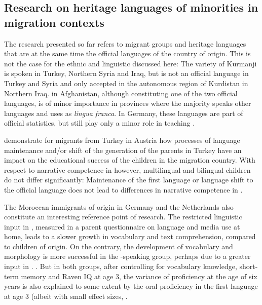 \documentclass[output=paper,colorlinks,citecolor=brown]{langscibook}
\begin{document}
\subsection{Research on heritage languages of minorities in migration contexts}\label{ch2.5.ss.2.3}

The research presented so far refers to migrant groups and heritage languages that are at the same time the official languages of the country of origin. This is not the case for the ethnic and linguistic  discussed here: The  variety of Kurmanji is spoken in Turkey, Northern Syria and Iraq, but is not an official language in Turkey and Syria and only accepted in the autonomous region of Kurdistan in Northern Iraq.  in Afghanistan, although constituting one of the two official languages, is of minor importance in provinces where the majority speaks other languages and uses  as \textit{lingua franca}. In Germany, these languages are part of official statistics, but still play only a minor role in teaching \citep{brehmer_mehlhorn2018}.

\citet{brizic2006,brizic_hufnagl2016,brizic_bulut_simsek2021,brizic2021} demonstrate for  migrants from Turkey in Austria how processes of language maintenance and/or shift of the generation of the parents in Turkey have an impact on the educational success of the children in the migration country. With respect to narrative competence in  however, multilingual and bilingual children do not differ significantly: Maintenance of the first language  or language shift to the official language  does not lead to differences in narrative competence in  \citep[215--228]{brizic2021}.

The Moroccan immigrants of  origin in Germany \citep{mehlem1998} and the Netherlands \citep{leseman_scheele_mayo_messer2009} also constitute an interesting reference point of research. The restricted linguistic input in , measured in a parent questionnaire on language and media use at home, leads to a slower growth in vocabulary and text comprehension, compared to children of  origin. On the contrary, the development of  vocabulary and morphology is more successful in the -speaking group, perhaps due to a greater input in . \citep[303]{leseman_scheele_mayo_messer2009}. But in both groups, after controlling for  vocabulary knowledge, short-term memory and Raven IQ at age 3, the variance of  proficiency at the age of six years is also explained to some extent by the oral proficiency in the first language at age 3 (albeit with small effect sizes, \citealt[308]{leseman_scheele_mayo_messer2009}.
\end{document}
